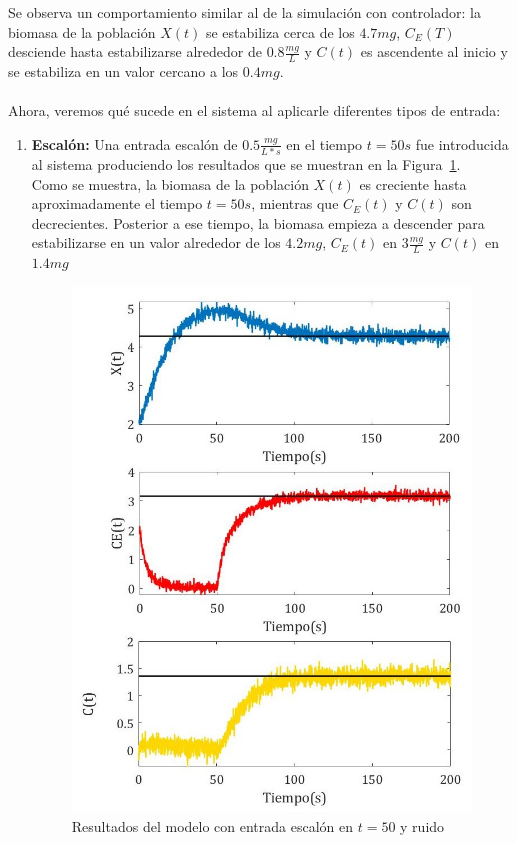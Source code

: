 Se observa un comportamiento similar al de la simulación con controlador: la biomasa de la población $X(t)$ se estabiliza cerca de los $4.7mg$, $C_E(T)$ desciende hasta estabilizarse alrededor de $0.8\frac{mg}{L}$ y $C(t)$ es ascendente al inicio y se estabiliza en un valor cercano a los $0.4mg$. \\ \ \\
Ahora, veremos qué sucede en el sistema al aplicarle diferentes tipos de entrada:
\begin{enumerate}
\item \textbf{Escalón:} Una entrada escalón de $0.5\frac{mg}{L*s}$ en el tiempo $t = 50s$ fue introducida al sistema produciendo los resultados que se muestran en la Figura~\ref{fig:entrada-escalon}. \\
Como se muestra, la biomasa de la población $X(t)$ es creciente hasta aproximadamente el tiempo $t = 50s$, mientras que $C_E(t)$ y $C(t)$ son decrecientes. Posterior a ese tiempo, la biomasa empieza a descender para estabilizarse en un valor alrededor de los $4.2mg$, $C_E(t)$ en $3\frac{mg}{L}$ y $C(t)$ en $1.4mg$ \\

\begin{figure}[ht!]
\centering
\includegraphics[scale = 0.4]{entrada-escalon}
\caption{Resultados del modelo con entrada escalón en $t = 50$ y ruido}
\label{fig:entrada-escalon}
\end{figure}


\end{enumerate}
